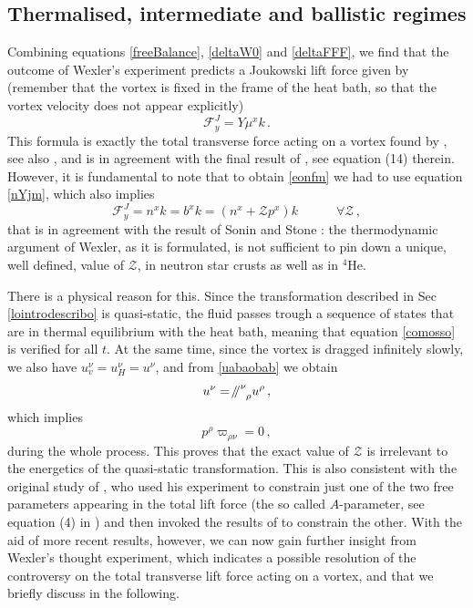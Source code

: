 \documentclass[preprints,article,accept,moreauthors,pdftex]{mdpi}
\newcommand{\spc}{\quad \quad \quad}
\newcommand{\paral}{\mathbin{\!/\mkern-5mu/\!}}
\begin{document}
\subsection{Thermalised, intermediate and ballistic regimes}

Combining equations \eqref{freeBalance}, \eqref{deltaW0} and \eqref{deltaFFF}, we find that the outcome of Wexler's experiment predicts a Joukowski lift force given by (remember that the vortex is fixed in the frame of the heat bath, so that the vortex velocity does not appear explicitly)
\begin{equation}
\label{eonfm}
\mathcal{F}^{J}_y = Y \mu^x k \, .
\end{equation}
This formula is exactly the total transverse force acting on a vortex found by \citet{Thouless2001},
see also \cite{geller2000}, and is in agreement with the final result of \cite{Wexler1997}, see equation (14) therein. 
However, it is fundamental to note that to obtain \eqref{eonfm}  we had to use equation \eqref{nYjm}, 
which also implies 
\begin{equation}\label{ikgbmlfv}
\mathcal{F}^{J}_y =  n^x k =b^x k = (n^x+\mathcal{Z}p^x) k \spc  \forall \mathcal{Z} \, ,
\end{equation}
that is in agreement with the result of Sonin and Stone \cite{sonin_book_2016}: the thermodynamic argument of Wexler, as it is formulated, is not sufficient to pin down a unique, well defined, value of $\mathcal{Z}$, in neutron star crusts as well as in $^4$He. 

There is a physical reason for this. Since the transformation described in Sec \ref{lointrodescribo} is quasi-static, the fluid passes trough a sequence of  states that are in thermal equilibrium with the heat bath, meaning that equation \eqref{comosso} is verified for all $t$. 
At the same time, since the vortex is dragged infinitely slowly, we also have
$ u_v^\nu = u_H^\nu =u^\nu$, and from  \eqref{uabaobab} we obtain
\begin{equation}
u^\nu = {\paral \,}\indices{^\nu _\rho} u^\rho \, ,
\end{equation}
which implies
\begin{equation}
p^\rho \varpi_{\rho \nu} =0 \, ,
\end{equation}
during the whole process. This proves that  the exact value of $\mathcal{Z}$ is irrelevant to the energetics of the quasi-static transformation. 
This is also consistent with the original study of \citet{Wexler1997}, who used his experiment to constrain just one of the two free parameters appearing in the total lift force (the so called $A$-parameter, see equation (4) in \cite{Wexler1997}) and then invoked the results of \citet{TAN_original1996} to constrain the other. 
With the aid of more recent results, however, we can now gain further insight from Wexler's thought experiment, which indicates a possible resolution of the controversy on the total transverse lift force acting on a vortex, and that we briefly discuss in the following.
\end{document}
